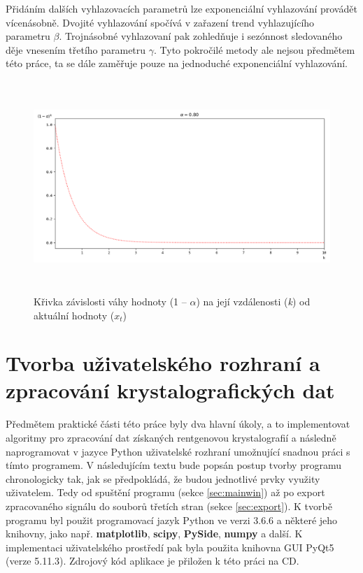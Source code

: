 \documentclass[a4paper, 12pt]{article}
\begin{document}
Přidáním dalších vyhlazovacích parametrů lze exponenciální vyhlazování provádět vícenásobně. Dvojité vyhlazování spočívá v zařazení trend vyhlazujícího parametru $\beta$. Trojnásobné vyhlazovaní pak zohledňuje i sezónnost sledovaného děje vnesením třetího parametru $\gamma$. Tyto pokročilé metody ale nejsou předmětem této práce, ta se dále zaměřuje pouze na jednoduché exponenciální vyhlazování.
\clearpage
\begin{figure}[h!]
    \centering
    \includegraphics[width=\linewidth,height=8cm]{EMAexp1.png}
    \caption{Křivka závislosti váhy hodnoty (1 -- $\alpha$) na její vzdálenosti (\textit{k}) od aktuální hodnoty (\textit{$x_t$})}
    \label{fig:EMAexp}
\end{figure}
\newpage
\section{Tvorba uživatelského rozhraní a zpracování krystalografických dat} \label{sec:prakticka}
Předmětem praktické části této práce byly dva hlavní úkoly, a to implementovat algoritmy pro zpracování dat získaných rentgenovou krystalografií a následně naprogramovat v jazyce Python uživatelské rozhraní umožnující snadnou práci s tímto programem. V následujícím textu bude popsán postup tvorby programu chronologicky tak, jak se předpokládá, že budou jednotlivé prvky využity uživatelem. Tedy od spuštění programu (sekce \ref{sec:mainwin}) až po export zpracovaného signálu do souborů třetích stran (sekce \ref{sec:export}). K tvorbě programu byl použit programovací jazyk Python ve verzi 3.6.6 a některé jeho knihovny, jako např. \textbf{matplotlib}, \textbf{scipy}, \textbf{PySide}, \textbf{numpy} a další. K implementaci uživatelského prostředí pak byla použita knihovna GUI PyQt5 (verze 5.11.3). \textcolor{cdorange}{Zdrojový kód aplikace je přiložen k této práci na CD}.
\end{document}
